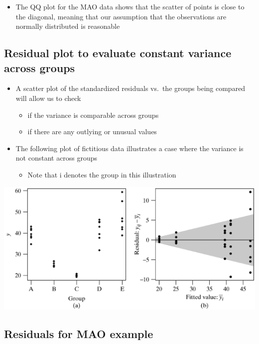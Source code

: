\documentclass[
]{book}
\providecommand{\tightlist}{%
  \setlength{\itemsep}{0pt}\setlength{\parskip}{0pt}}
\begin{document}
\begin{itemize}
\tightlist
\item
  The QQ plot for the MAO data shows that the scatter of points is close to the diagonal, meaning that our assumption that the observations are normally distributed is reasonable
\end{itemize}

\hypertarget{residual-plot-to-evaluate-constant-variance-across-groups}{%
\subsection{Residual plot to evaluate constant variance across groups}\label{residual-plot-to-evaluate-constant-variance-across-groups}}

\begin{itemize}
\tightlist
\item
  A scatter plot of the standardized residuals vs.~the groups being compared will allow us to check

  \begin{itemize}
  \tightlist
  \item
    if the variance is comparable across groups
  \item
    if there are any outlying or unusual values
  \end{itemize}
\item
  The following plot of fictitious data illustrates a case where the variance is not constant across groups

  \begin{itemize}
  \tightlist
  \item
    Note that i denotes the group in this illustration
  \end{itemize}
\end{itemize}

\includegraphics[width=0.5\linewidth]{./10_45}

\hypertarget{residuals-for-mao-example-1}{%
\subsection{Residuals for MAO example}\label{residuals-for-mao-example-1}}
\end{document}
